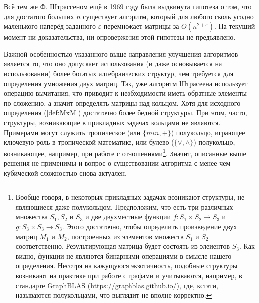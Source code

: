 Всё тем же Ф. Штрассеном ещё в 1969 году была выдвинута гипотеза о том, что для достатого больших $n$ существует алгоритм, который для любого сколь угодно маленького наперёд заданного $\varepsilon$ перемножает матрицы за $O(n^{2+\varepsilon})$. На текущий момент ни доказательства, ни опровержения этой гипотезы не предъявлено.

Важной особенностью указанного выше направления улучшения алгоритмов является то, что оно допускает использования (и даже основывается на использовании) более богатых алгебраических структур, чем требуется для определения умножения двух матриц. Так, уже алгоритм Штрасеена использует операцию вычитания, что приводит к необходимости иметь обратные элементы по сложению, а значит определять матрицы над кольцом. Хотя для исходного определения (\ref{def:MxM}) достаточно более бедной структуры. При этом, часто, структуры, возникающие в прикладных задачах кольцами не являются. Примерами могут служить тропическое (или $\{min,+\}$) полукольцо, играющее ключевую роль в тропической математике, или булево ($\{\vee,\wedge\}$) полукольцо, возникающее, например, при работе с отношениями\footnote{Вообще говоря, в некоторых прикладных задачах возникают структуры, не являющиеся даже полукольцом. Предположим, что есть три различных множества $S_1, S_2$ и $S_3$ и две двухместные функции $f:S_1 \times S_2 \to S_3$ и $g: S_3 \times S_3 \to S_3$. Этого достаточно, чтобы определить произведение двух матриц $M_1$ и $M_2$, построенных из элементов множеств $S_1$ и $S_2$ соответственно. Результирующая матрица будет состоять из элеиентов $S_3$. Как видно, функции не являются бинарными операциями в смысле нашего определения. Несотря на кажущуюся экзотичность, подобные структуры возникают на практике при работе с графами и учитываются, например, в стандарте GraphBLAS (\url{https://graphblas.github.io/}), где, кстати, называются полукольцами, что выглядит не вполне корректно.}. Значит, описанные выше решения не применимы и вопрос о существовании алгоритма с менее чем кубической сложностью снова актуален. 

